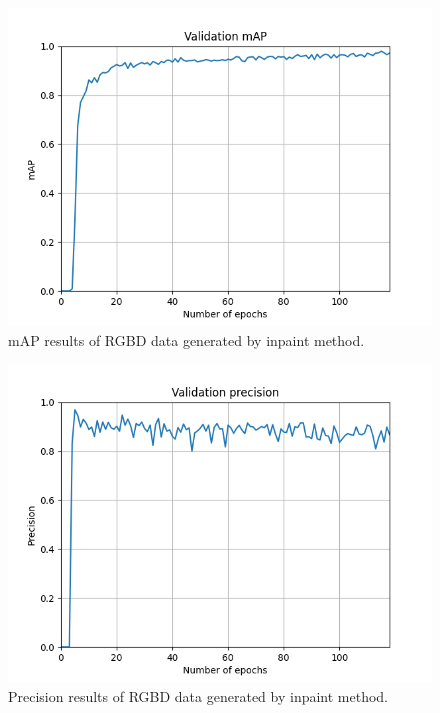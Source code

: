 \documentclass[twoside]{ctuthesis}
\theoremstyle{plain}
\theoremstyle{definition}
\theoremstyle{note}
\begin{document}
\begin{figure}[h!]
	\centering
	\includegraphics[width=\textwidth]{run-depth_inpaint-tag-validation_mAP.png}
	\caption{mAP results of RGBD data generated by inpaint method.}
\end{figure}
\pagebreak
\begin{figure}[h!]
	\centering
	\includegraphics[width=\textwidth]{run-depth_inpaint-tag-validation_precision.png}
	\caption{Precision results of RGBD data generated by inpaint method.}
\end{figure}
\end{document}

